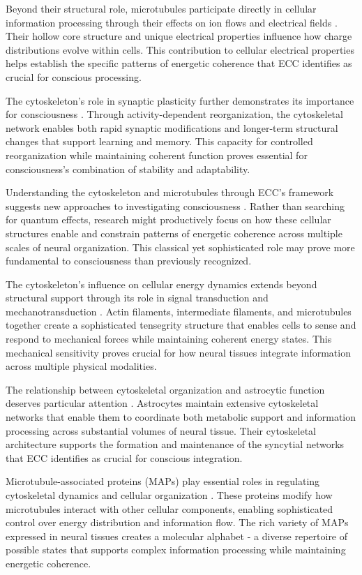 Beyond their structural role, microtubules participate directly in cellular information processing through their effects on ion flows and electrical fields \cite{Dent2014}. Their hollow core structure and unique electrical properties influence how charge distributions evolve within cells. This contribution to cellular electrical properties helps establish the specific patterns of energetic coherence that ECC identifies as crucial for conscious processing.

The cytoskeleton's role in synaptic plasticity further demonstrates its importance for consciousness \cite{Kapitein2015}. Through activity-dependent reorganization, the cytoskeletal network enables both rapid synaptic modifications and longer-term structural changes that support learning and memory. This capacity for controlled reorganization while maintaining coherent function proves essential for consciousness's combination of stability and adaptability.

Understanding the cytoskeleton and microtubules through ECC's framework suggests new approaches to investigating consciousness \cite{Nogales2000}. Rather than searching for quantum effects, research might productively focus on how these cellular structures enable and constrain patterns of energetic coherence across multiple scales of neural organization. This classical yet sophisticated role may prove more fundamental to consciousness than previously recognized.

The cytoskeleton's influence on cellular energy dynamics extends beyond structural support through its role in signal transduction and mechanotransduction \cite{Fletcher2010}. Actin filaments, intermediate filaments, and microtubules together create a sophisticated tensegrity structure that enables cells to sense and respond to mechanical forces while maintaining coherent energy states. This mechanical sensitivity proves crucial for how neural tissues integrate information across multiple physical modalities.

The relationship between cytoskeletal organization and astrocytic function deserves particular attention \cite{Sanchez-Huertas2016}. Astrocytes maintain extensive cytoskeletal networks that enable them to coordinate both metabolic support and information processing across substantial volumes of neural tissue. Their cytoskeletal architecture supports the formation and maintenance of the syncytial networks that ECC identifies as crucial for conscious integration.

Microtubule-associated proteins (MAPs) play essential roles in regulating cytoskeletal dynamics and cellular organization \cite{Roll-Mecak2020}. These proteins modify how microtubules interact with other cellular components, enabling sophisticated control over energy distribution and information flow. The rich variety of MAPs expressed in neural tissues creates a molecular alphabet - a diverse repertoire of possible states that supports complex information processing while maintaining energetic coherence.

